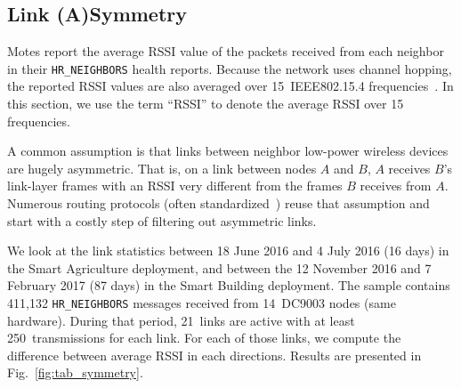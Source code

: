 \documentclass{elsarticle}
\newcommand{\building}            {Smart Building\xspace}
\newcommand{\agri}                {Smart Agriculture\xspace}
\newcommand{\HRNEIGHBORS}         {{\tt HR\_NEIGHBORS}\xspace}
\begin{document}
\subsection{Link (A)Symmetry}
\label{sec:symmetry}


Motes report the average RSSI value of the packets received from each neighbor in their \HRNEIGHBORS health reports.
Because the network uses channel hopping, the reported RSSI values are also averaged over 15~IEEE802.15.4 frequencies~\cite{std_ieee802154_2015}.
In this section, we use the term ``RSSI'' to denote the average RSSI over 15 frequencies.


A common assumption is that links between neighbor low-power wireless devices are hugely asymmetric.
That is, on a link between nodes $A$ and $B$, $A$ receives $B$'s link-layer frames with an RSSI very different from the frames $B$ receives from $A$.
Numerous routing protocols (often standardized~\cite{rfc3626}) reuse that assumption and start with a costly step of filtering out asymmetric links.


We look at the link statistics between 18 June 2016 and 4 July 2016 (16 days) in the \agri deployment, and between the 12 November 2016 and 7 February 2017 (87 days) in the \building deployment.
The sample contains 411,132 \HRNEIGHBORS messages received from 14~DC9003 nodes (same hardware).
During that period, 21~links are active with at least 250~transmissions for each link.
For each of those links, we compute the difference between average RSSI in each directions.
Results are presented in Fig.~\ref{fig:tab_symmetry}.
\end{document}
